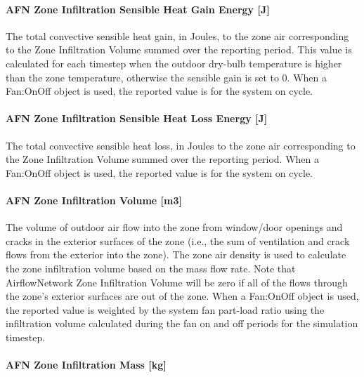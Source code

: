 \paragraph{AFN Zone Infiltration Sensible Heat Gain Energy {[}J{]}}\label{afn-zone-infiltration-sensible-heat-gain-energy-j-1}

The total convective sensible heat gain, in Joules, to the zone air corresponding to the Zone Infiltration Volume summed over the reporting period. This value is calculated for each timestep when the outdoor dry-bulb temperature is higher than the zone temperature, otherwise the sensible gain is set to 0. When a Fan:OnOff object is used, the reported value is for the system on cycle.

\paragraph{AFN Zone Infiltration Sensible Heat Loss Energy {[}J{]}}\label{afn-zone-infiltration-sensible-heat-loss-energy-j-1}

The total convective sensible heat loss, in Joules to the zone air corresponding to the Zone Infiltration Volume summed over the reporting period. When a Fan:OnOff object is used, the reported value is for the system on cycle.

\paragraph{AFN Zone Infiltration Volume {[}m3{]}}\label{afn-zone-infiltration-volume-m3}

The volume of outdoor air flow into the zone from window/door openings and cracks in the exterior surfaces of the zone (i.e., the sum of ventilation and crack flows from the exterior into the zone). The zone air density is used to calculate the zone infiltration volume based on the mass flow rate. Note that AirflowNetwork Zone Infiltration Volume will be zero if all of the flows through the zone's exterior surfaces are out of the zone. When a Fan:OnOff object is used, the reported value is weighted by the system fan part-load ratio using the infiltration volume calculated during the fan on and off periods for the simulation timestep.

\paragraph{AFN Zone Infiltration Mass {[}kg{]}}\label{afn-zone-infiltration-mass-kg}

